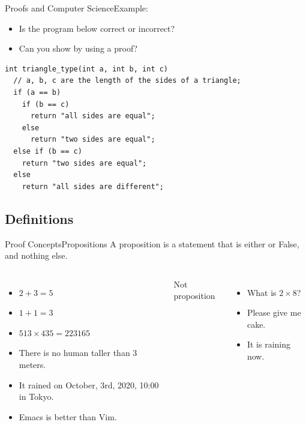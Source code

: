 \begin{frame}[fragile]{Proofs and Computer Science}{Example:}
  \begin{itemize}
    \item Is the program below correct or incorrect?
    \item Can you show by using a proof?
  \end{itemize}
  \bigskip

\begin{verbatim}
int triangle_type(int a, int b, int c)
  // a, b, c are the length of the sides of a triangle;
  if (a == b)
    if (b == c)
      return "all sides are equal";
    else
      return "two sides are equal";
  else if (b == c)
    return "two sides are equal";
  else
    return "all sides are different";
\end{verbatim}
\end{frame}

\subsection{Definitions}

\begin{frame}{Proof Concepts}{Propositions}
  A proposition is a statement that is either  or \alert{False}, and nothing else.\bigskip

  \begin{columns}[T]
    \begin{itemize}
      \item $2 + 3 = 5$
      \item $1 + 1 = 3$
      \item $513 \times 435 = 223165$
      \item There is no human taller than 3 meters.
      \item It rained on October, 3rd, 2020, 10:00 in Tokyo.
      \item Emacs is better than Vim.
    \end{itemize}
    \alert{Not proposition}
    \begin{itemize}
      \item What is $2 \times 8$?
      \item Please give me cake.
      \item It is raining now.
    \end{itemize}
  \end{columns}
\end{frame}

